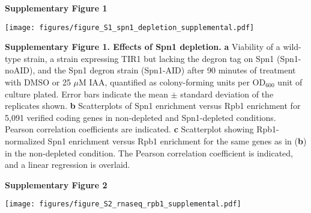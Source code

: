 \documentclass[8pt]{extarticle}
\begin{document}
\textbf{\large Supplementary Figure 1}

{\texttt{[image: figures/figure\_S1\_spn1\_depletion\_supplemental.pdf]}\par}

\textbf{Supplementary Figure 1. Effects of Spn1 depletion.}
\textbf{a} Viability of a wild-type strain, a strain expressing TIR1 but lacking the degron tag on Spn1 (Spn1-noAID), and the Spn1 degron strain (Spn1-AID) after 90 minutes of treatment with DMSO or 25 $\mu$M IAA, quantified as colony-forming units per OD$_{600}$ unit of culture plated.
Error bars indicate the mean $\pm$ standard deviation of the replicates shown.
\textbf{b} Scatterplots of Spn1 enrichment versus Rpb1 enrichment for 5,091 verified coding genes in non-depleted and Spn1-depleted conditions.
Pearson correlation coefficients are indicated.
\textbf{c} Scatterplot showing Rpb1-normalized Spn1 enrichment versus Rpb1 enrichment for the same genes as in (\textbf{b}) in the non-depleted condition.
The Pearson correlation coefficient is indicated, and a linear regression is overlaid.

\newpage

\textbf{\large Supplementary Figure 2}

{\texttt{[image: figures/figure\_S2\_rnaseq\_rpb1\_supplemental.pdf]}\par}
\end{document}
